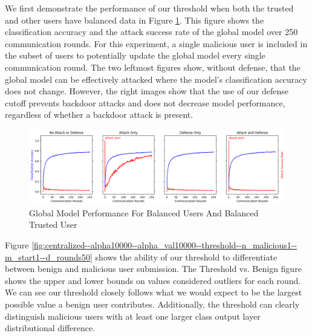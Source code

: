 \documentclass{article} %
\begin{document}
We first demonstrate the performance of our threshold when both the trusted and other users have balanced data in Figure \ref{fig:centralized--alpha10000--alpha_val10000--accuracy--n_malicious1--m_start1}. This figure shows the classification accuracy and the attack success rate of the global model over 250 communication rounds. For this experiment, a single malicious user is included in the subset of users to potentially update the global model every single communication round. The two leftmost figures show, without defense, that the global model can be effectively attacked where the model's classification accuracy does not change. However, the right images show that the use of our defense cutoff prevents backdoor attacks and does not decrease model performance, regardless of whether a backdoor attack is present. 

\begin{figure}[H]
    \centering
    \includegraphics[width=\textwidth]{01_trusted/centralized/alpha10000--alpha_val10000/visuals/accuracy--n_malicious1--m_start1.png}
    \caption{Global Model Performance For Balanced Users And Balanced Trusted User}
    \label{fig:centralized--alpha10000--alpha_val10000--accuracy--n_malicious1--m_start1}
\end{figure}

Figure \ref{fig:centralized--alpha10000--alpha_val10000--threshold--n_malicious1--m_start1--d_rounds50} shows the ability of our threshold to differentiate between benign and malicious user submission. The Threshold vs. Benign figure shows the upper and lower bounds on values considered outliers for each round. We can see our threshold closely follows what we would expect to be the largest possible value a benign user contributes. Additionally, the threshold can clearly distinguish malicious users with at least one larger class output layer distributional difference. 
\end{document}
